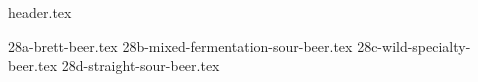 \clearpage
{}
\divisorLine
{header.tex}
\begin{multicols}{2}
{28a-brett-beer.tex}
{28b-mixed-fermentation-sour-beer.tex}
{28c-wild-specialty-beer.tex}
{28d-straight-sour-beer.tex}
\end{multicols}